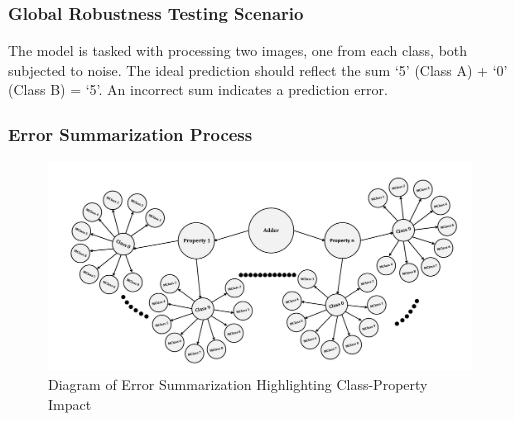 \documentclass[10pt, conference, a4paper, final]{IEEEtran}
\begin{document}
\subsubsection{Global Robustness Testing Scenario}
The model is tasked with processing two images, one from each class, both subjected to noise. The ideal prediction should reflect the sum `5' (Class A) + `0' (Class B) = `5'. An incorrect sum indicates a prediction error.

\subsubsection{Error Summarization Process}

\begin{figure}[H]
    \centering
    \includegraphics[width=\linewidth]{paper_images/step4.pdf}
    \caption{Diagram of Error Summarization Highlighting Class-Property Impact}
    \label{fig:error-summarization}
\end{figure}
\end{document}
